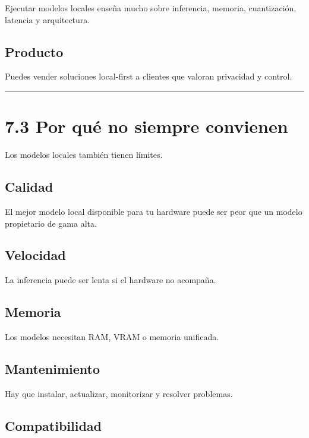 Ejecutar modelos locales enseña mucho sobre inferencia, memoria,
cuantización, latencia y arquitectura.

\subsection{Producto}\label{producto-1}

Puedes vender soluciones local-first a clientes que valoran privacidad y
control.

\begin{center}\rule{0.5\linewidth}{0.5pt}\end{center}

\section{7.3 Por qué no siempre
convienen}\label{por-quuxe9-no-siempre-convienen}

Los modelos locales también tienen límites.

\subsection{Calidad}\label{calidad-1}

El mejor modelo local disponible para tu hardware puede ser peor que un
modelo propietario de gama alta.

\subsection{Velocidad}\label{velocidad}

La inferencia puede ser lenta si el hardware no acompaña.

\subsection{Memoria}\label{memoria-1}

Los modelos necesitan RAM, VRAM o memoria unificada.

\subsection{Mantenimiento}\label{mantenimiento-1}

Hay que instalar, actualizar, monitorizar y resolver problemas.

\subsection{Compatibilidad}\label{compatibilidad}

